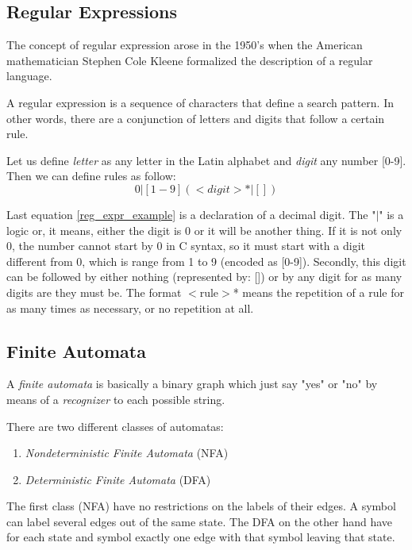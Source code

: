 \documentclass[conference]{IEEEtran}
\begin{document}
\subsection{Regular Expressions}
The concept of regular expression arose in the 1950's when the American mathematician Stephen Cole Kleene formalized the description of a regular language.

A regular expression is a sequence of characters that define a search pattern. In other words, there are a conjunction of letters and digits that follow a certain rule.

Let us define \textit{letter} as any letter in the Latin alphabet and \textit{digit} any number [0-9]. Then we can define rules as follow: 
\begin{equation}
0 | [1-9] (<digit>* | [])\label{reg_expr_example}
\end{equation}

Last equation \ref{reg_expr_example} is a declaration of a decimal digit. The "$|$" is a logic or, it means, either the digit is 0 or it will be another thing. If it is not only 0, the number cannot start by 0 in C syntax, so it must start with a digit different from 0, which is range from 1 to 9 (encoded as [0-9]). Secondly, this digit can be followed by either nothing (represented by: []) or by any digit for as many digits are they must be. The format $<$rule$>$* means the repetition of a rule for as many times as necessary, or no repetition at all.

\subsection{Finite Automata}
A \textit{finite automata} is basically a binary graph which just say "yes" or "no" by means of a \textit{recognizer} to each possible string.

There are two different classes of automatas:
\begin{enumerate}
	\item \textit{Nondeterministic Finite Automata} (NFA)
	\item \textit{Deterministic Finite Automata} (DFA)
\end{enumerate}
The first class (NFA) have no restrictions on the labels of their edges. A symbol can label several edges out of the same state. The DFA on the other hand have for each state and symbol exactly one edge with that symbol leaving that state. 
\end{document}
